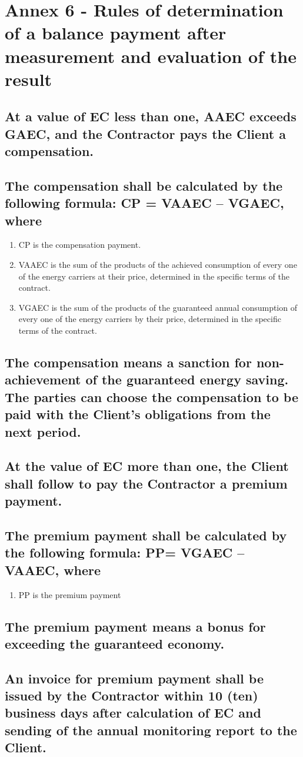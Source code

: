 \section{Annex 6 {-} Rules of determination of a balance payment after measurement and evaluation of the result}

\subsection{At a value of EC less than one, AAEC exceeds GAEC, and the Contractor pays the Client a compensation.}

\subsection{The compensation shall be calculated by the following
  formula: CP = VAAEC – VGAEC, where}

\begin{enumerate}
\item CP is the compensation payment.
\item VAAEC is the sum of the products of the achieved consumption of
  every one of the energy carriers at their price, determined in the
  specific terms of the contract.
\item VGAEC is the sum of the products of the guaranteed annual
  consumption of every one of the energy carriers by their price,
  determined in the specific terms of the contract.
\end{enumerate}

\subsection{The compensation means a sanction for non-achievement of the guaranteed energy saving. The parties can choose the compensation to be paid with the Client’s obligations from the next period.}

\subsection{At the value of EC more than one, the Client shall follow to pay the Contractor a premium payment.}

\subsection{The premium payment shall be calculated by the following formula: PP= VGAEC – VAAEC, where}
\begin{enumerate}
	\item PP is the premium payment
\end{enumerate}

\subsection{The premium payment means a bonus for exceeding the guaranteed economy.}

\subsection{An invoice for premium payment shall be issued by the Contractor within 10 (ten) business days after calculation of EC and sending of the annual monitoring report to the Client.}
